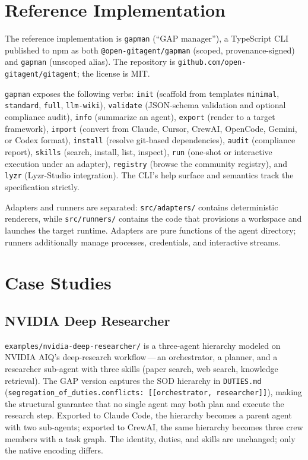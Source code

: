 \documentclass[11pt,a4paper]{article}
\begin{document}
\section{Reference Implementation}\label{sec:impl}

The reference implementation is \texttt{gapman} (``GAP manager''), a TypeScript CLI
published to npm as both \texttt{@open-gitagent/gapman} (scoped, provenance-signed)
and \texttt{gapman} (unscoped alias). The repository is
\texttt{github.com/open-gitagent/gitagent}; the license is MIT.

\texttt{gapman} exposes the following verbs: \texttt{init} (scaffold from templates
\texttt{minimal}, \texttt{standard}, \texttt{full}, \texttt{llm-wiki}),
\texttt{validate} (JSON-schema validation and optional compliance audit),
\texttt{info} (summarize an agent), \texttt{export} (render to a target framework),
\texttt{import} (convert from Claude, Cursor, CrewAI, OpenCode, Gemini, or Codex
format), \texttt{install} (resolve git-based dependencies), \texttt{audit}
(compliance report), \texttt{skills} (search, install, list, inspect),
\texttt{run} (one-shot or interactive execution under an adapter),
\texttt{registry} (browse the community registry), and \texttt{lyzr} (Lyzr-Studio
integration). The CLI's help surface and semantics track the specification strictly.

Adapters and runners are separated: \texttt{src/adapters/} contains deterministic
renderers, while \texttt{src/runners/} contains the code that provisions a workspace
and launches the target runtime. Adapters are pure functions of the agent directory;
runners additionally manage processes, credentials, and interactive streams.

\section{Case Studies}\label{sec:cases}

\subsection{NVIDIA Deep Researcher}

\texttt{examples/nvidia-deep-researcher/} is a three-agent hierarchy modeled on NVIDIA
AIQ's deep-research workflow\,---\,an orchestrator, a planner, and a researcher
sub-agent with three skills (paper search, web search, knowledge retrieval). The GAP
version captures the SOD hierarchy in \texttt{DUTIES.md}
(\texttt{segregation\_of\_duties.conflicts: [[orchestrator, researcher]]}), making
the structural guarantee that no single agent may both plan and execute the research
step. Exported to Claude Code, the hierarchy becomes a parent agent with two
sub-agents; exported to CrewAI, the same hierarchy becomes three crew members with a
task graph. The identity, duties, and skills are unchanged; only the native encoding
differs.
\end{document}
